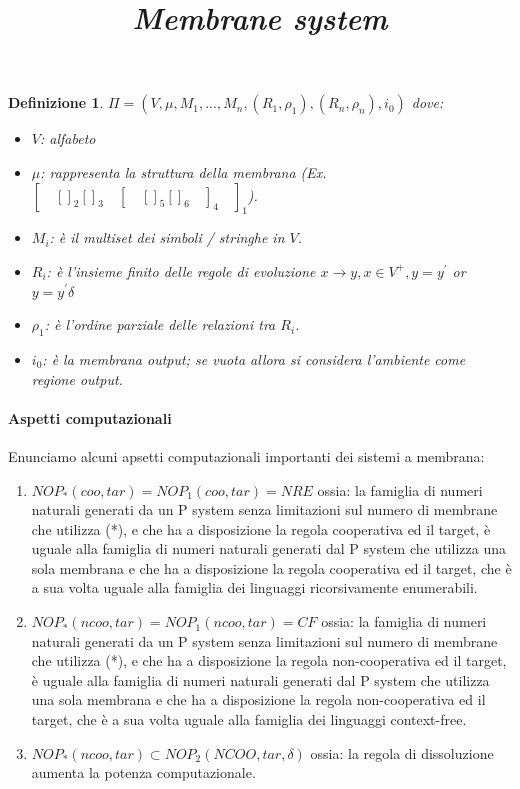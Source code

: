 \documentclass[12pt,a4paper]{report}
\newtheorem{definizione}{Definizione}[section]
\begin{document}
\begin{definizione}
\title{\emph{Membrane system}}

$\Pi = (V, \mu, M_{1}, ..., M_{n}, (R_{1}, \rho_{1}), (R_{n}, \rho_{n}), i_{0})$
dove:
\begin{itemize}
\item $V$: alfabeto
\item $\mu$: rappresenta la struttura della membrana (Ex. $[ \quad [ ]_{2} [ ]_{3} \quad [ \quad [ ]_{5} [ ]_{6} \quad ]_{4} \quad ]_{1}$).
\item $M_{i}$: è il multiset dei simboli / stringhe in $V$.
\item $R_{i}$: è l'insieme finito delle regole di evoluzione
$x \rightarrow y, x \in V^{+}, y = y^{'}$ or $y = y^{'} \delta $
\item $\rho_{1}$: è l'ordine parziale delle relazioni tra $R_{i}$.
\item $i_{0}$: è la membrana output; se vuota allora si considera l'ambiente come regione output.
\end{itemize}
\end{definizione}

\paragraph{Aspetti computazionali}
Enunciamo alcuni apsetti computazionali importanti dei sistemi a membrana:
\begin{enumerate}
\item $NOP_* (coo, tar) = NOP_1 (coo, tar) = NRE$
ossia: la famiglia di numeri naturali generati da un P system senza limitazioni sul numero di membrane che utilizza (*), e che ha a disposizione la regola cooperativa ed il target, è uguale alla famiglia di numeri naturali generati dal P system che utilizza una sola membrana e che ha a disposizione la regola cooperativa ed il target, che è a sua volta uguale alla famiglia dei linguaggi ricorsivamente enumerabili.
\item $NOP_* (ncoo, tar) = NOP_1 (ncoo, tar) = CF$
ossia: la famiglia di numeri naturali generati da un P system senza limitazioni sul numero di membrane che utilizza (*), e che ha a disposizione la regola non-cooperativa ed il target, è uguale alla famiglia di numeri naturali generati dal P system che utilizza una sola membrana e che ha a disposizione la regola non-cooperativa ed il target, che è a sua volta uguale alla famiglia dei linguaggi context-free.
\item $NOP_* (ncoo, tar) \subset NOP_2(NCOO, tar, \delta)$
ossia: la regola di dissoluzione aumenta la potenza computazionale.
\end{enumerate}
\end{document}
